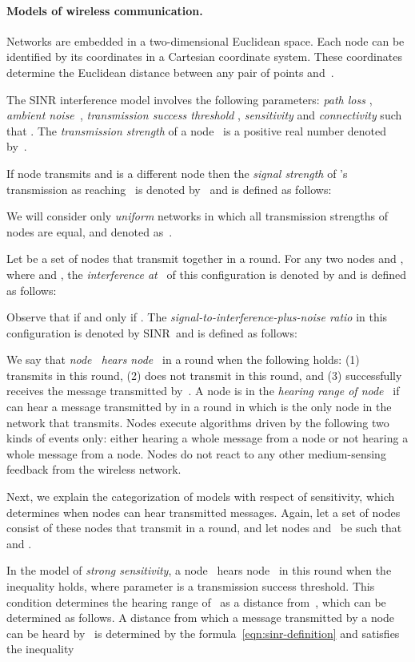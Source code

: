 \documentclass[11pt]{article}
\newcommand{\BBB}{\vspace*{-\bigskipamount}}
\newcommand{\Paragraph}[1]{\BBB\paragraph{#1}}
\begin{document}
\Paragraph{Models of wireless communication.}


Networks are embedded in a two-dimensional Euclidean space.
Each node can be identified by its coordinates in a Cartesian coordinate system.
These  coordinates determine the Euclidean distance  between any pair of  points  and~.



The  SINR interference model involves the following parameters:
 \emph{path loss },  \emph{ambient noise~},  \emph{transmission success threshold }, \emph{sensitivity } and  \emph{connectivity  } such that .
The \emph{transmission strength} of a node~  is a positive real number denoted by~.

If node  transmits and  is a different node then the \emph{signal strength} of 's transmission as reaching~ is denoted by~ and is defined as follows:

We will consider only \emph{uniform} networks in which all transmission strengths of nodes are equal, and denoted as~.

Let  be a set of nodes that transmit together in a round.
For any two nodes  and , where  and , the \emph{interference at~} of this configuration is denoted by  and is defined as follows:

Observe that  if and only if .
The \emph{signal-to-interference-plus-noise ratio} in this configuration is denoted by SINR\, and is defined as follows:


We say that \emph{node~ hears node~} in a round when the following holds: (1)  transmits in this round, (2)  does not transmit in  this round, and (3)  successfully  receives the message transmitted by~.
A node  is in the \emph{hearing range of node~} if  can hear a message transmitted by  in a round in which  is the only node in the network that transmits.
Nodes execute algorithms driven by the following two kinds of events only: either hearing a whole message from a node or not hearing a whole message from a node.
Nodes do not react to any other medium-sensing feedback from the wireless network.


Next, we explain the categorization of models with respect of sensitivity, which determines when nodes can hear transmitted messages.
Again, let a set of nodes~ consist of these nodes that transmit in a round, and let nodes  and~ be such that  and .

In the model of \emph{strong sensitivity}, a node~ hears node~ in this round when the inequality  holds, where parameter  is a transmission success threshold.
This condition determines the hearing range of~ as a distance from~, which can be determined as follows.
A distance  from which a message transmitted by a node~ can be heard by~  is determined by the formula~\eqref{eqn:sinr-definition} and satisfies the inequality 
\end{document}
